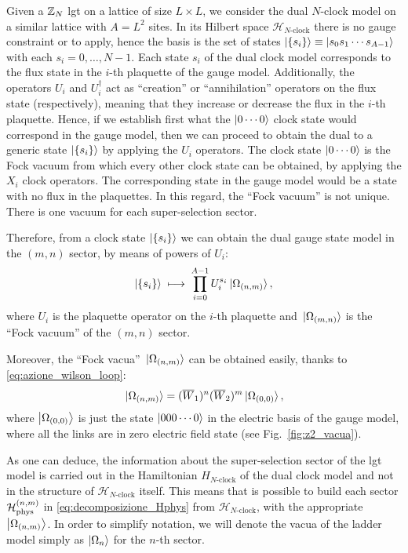 Given a $\mathbb{Z}_N$ \ac{lgt} on a lattice of size $L \times L$, we consider the dual $N$-clock model on a similar lattice with $A = L^2$ sites.
In its Hilbert space $\mathcal{H}_{N\text{-clock}}$ there is no gauge constraint or to apply,
hence the basis is the set of states $\ket{ \{s_i\} } \equiv \ket{s_0 s_1 \cdots s_{A-1}}$ with each $s_i = 0, \dots, N-1$.
Each state $s_i$ of the dual clock model corresponds to the flux state in the $i$-th plaquette of the gauge model.
Additionally, the operators $U_i$ and $U_i^{\dagger}$ act as ``creation'' or ``annihilation'' operators on the flux state (respectively), meaning that they increase or decrease the flux in the $i$-th plaquette.
Hence, if we establish first what the $\ket{0 \cdots 0}$ clock state would correspond in the gauge model, then we can proceed to obtain the dual to a generic state $\ket{\{s_i\}}$ by applying the $U_i$ operators.
The clock state $\ket{0 \cdots 0}$ is the Fock vacuum from which every other clock state can be obtained, by applying the $X_i$ clock operators.
The corresponding state in the gauge model would be a state with no flux in the plaquettes.
In this regard, the ``Fock vacuum'' is not unique.
There is one vacuum for each super-selection sector.

Therefore, from a clock state $\ket{ \{s_i\} }$ we can obtain the dual gauge state model in the $(m, n)$ sector, by means of powers of $U_i$:
\begin{equation}
    \ket{\{s_i\} } \; \longmapsto \;
    \prod_{i=0}^{A-1} U_i^{s_i} \ket*{\Omega_{(n,m)}},
\end{equation}
where $U_i$ is the plaquette operator on the $i$-th plaquette and $\ket*{\Omega_{(m,n)}}$ is the ``Fock vacuum'' of the $(m, n)$ sector.

Moreover, the ``Fock vacua'' $\ket*{\Omega_{(n,m)}}$ can be obtained easily, thanks to \eqref{eq:azione_wilson_loop}:
\begin{equation}
    \ket*{\Omega_{(n,m)}} = (\overline{W}_1)^n (\overline{W}_2)^m \ket*{\Omega_{(0,0)}},
\end{equation}
where $\ket{\Omega_{(0,0)}}$ is just the state $\ket{000 \cdots 0}$ in the electric basis of the gauge model, where all the links are in zero electric field state (see Fig.~\ref{fig:z2_vacua}).


As one can deduce, the information about the super-selection sector of the \ac{lgt} model is carried out in the Hamiltonian $H_{N\text{-clock}}$ of the dual clock model and not in the structure of $\mathcal{H}_{N \text{-clock}}$ itself.
This means that is possible to build each sector $\mathcal{H}_{\text{phys}}^{(n,m)}$ in \eqref{eq:decomposizione_Hphys} from $\mathcal{H}_{N \text{-clock}}$, with the appropriate $\ket{\Omega_{(n,m)}}$.
In order to simplify notation, we will denote the vacua of the ladder model simply as $\ket{\Omega_{n}}$ for the $n$-th sector.


